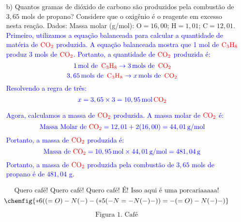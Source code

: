 \documentclass[a4paper, 12pt]{article}
\begin{document}
\begin{enumerate}
\begin{enumerate}[align=left, labelsep=-0.5em]
              \item[b)] Quantos gramas de dióxido de carbono são produzidos pela combustão
                    de $3,65$ mols de propano? Considere que o oxigênio é o reagente em
                    excesso nesta reação. Dados: Massa molar (g/mol): $\text{O}= 16,00$;
                    $\text{H}= 1,01$; $\text{C}= 12,01$.
                    \\[10pt]
                    \textcolor{blue}{Primeiro, utilizamos a equação balanceada para calcular a quantidade de matéria de \(\textcolor{red}{\text{CO}_{2}}\) produzida. A equação balanceada mostra que 1 mol de \(\textcolor{red}{\text{C}_{3}\text{H}_{8}}\) produz 3 mols de \(\textcolor{red}{\text{CO}_{2}}\). Portanto, a quantidade de \(\textcolor{red}{\text{CO}_{2}}\) produzida é:}
                    \[
                        \textcolor{blue}{1 \, \text{mol de } \, \textcolor{red}{\text{C}_{3}\text{H}_{8}} \rightarrow 3 \, \text{mols de } \, \textcolor{red}{\text{CO}_{2}}}
                    \]
                    \[
                        \textcolor{blue}{3,65 \, \text{mols de } \, \textcolor{red}{\text{C}_{3}\text{H}_{8}} \rightarrow x \, \text{mols de } \, \textcolor{red}{\text{CO}_{2}}}
                    \]
                    \textcolor{blue}{Resolvendo a regra de três:}
                    \[
                        \textcolor{blue}{x = 3,65 \times 3 = 10,95 \, \text{mol} \, \textcolor{red}{\text{CO}_{2}}}
                    \]

                    \textcolor{blue}{Agora, calculamos a massa de \(\textcolor{red}{\text{CO}_{2}}\) produzida. A massa molar de \(\textcolor{red}{\text{CO}_{2}}\) é:}
                    \[
                        \textcolor{blue}{\text{Massa Molar de } \textcolor{red}{\text{CO}_{2}} = 12,01 + 2(16,00) = 44,01 \, \text{g/mol}}
                    \]
                    \textcolor{blue}{Portanto, a massa de \(\textcolor{red}{\text{CO}_{2}}\) produzida é:}
                    \[
                        \textcolor{blue}{\text{Massa de } \textcolor{red}{\text{CO}_{2}} = 10,95 \, \text{mol} \times 44,01 \, \text{g/mol} = 481,04 \, \text{g}}
                    \]
                    \textcolor{blue}{Portanto, a massa de \(\textcolor{red}{\text{CO}_{2}}\) produzida pela combustão de $3,65$ mols de propano é de $481,04$ g.}
          \end{enumerate}

          \[
              \text{Quero café! Quero café! Quero café! É! Isso aqui é uma porcariaaaaa!}
          \]
          \[
              \chemfig{*6((=O)-N(-)-(*5(-N=-N(-)-))=-(=O)-N(-)-)}
          \]

          \[
              \text{Figura 1. Café}
          \]
\end{enumerate}
\end{document}
